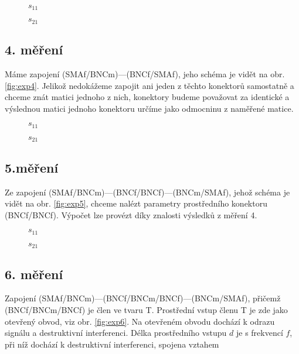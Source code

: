 \documentclass{protokol}
\begin{document}
\begin{figure}[htp]
	\centering
	
	\caption{$s_{11}$}
	\label{fig:03-s11}
\end{figure}

\begin{figure}[htp]
	\centering
	
	\caption{$s_{21}$}
	\label{fig:03-s21}
\end{figure}

\subsection{4. měření}
Máme zapojení (SMAf/BNCm)---(BNCf/SMAf), jeho schéma je vidět na obr. \ref{fig:exp4}. Jelikož nedokážeme zapojit ani jeden z těchto konektorů samostatně a chceme znát matici jednoho z nich, konektory budeme  považovat za identické a výslednou matici jednoho konektoru určíme jako odmocninu z naměřené matice.

\begin{figure}[htp]
	\centering
	
	\caption{$s_{11}$}
	\label{fig:04-s11}
\end{figure}

\begin{figure}[htp]
	\centering
	
	\caption{$s_{21}$}
	\label{fig:04-s21}
\end{figure}


\subsection{5.měření}
Ze zapojení (SMAf/BNCm)---(BNCf/BNCf)---(BNCm/SMAf), jehož schéma je vidět na obr. \ref{fig:exp5}, chceme nalézt parametry prostředního konektoru (BNCf/BNCf). Výpočet lze provézt díky znalosti výsledků z měření 4.

\begin{figure}[htp]
	\centering
	
	\caption{$s_{11}$}
	\label{fig:05-s11}
\end{figure}

\begin{figure}[htp]
	\centering
	
	\caption{$s_{21}$}
	\label{fig:05-s21}
\end{figure}

\subsection{6. měření}
Zapojení (SMAf/BNCm)---(BNCf/BNCm/BNCf)---(BNCm/SMAf), přičemž (BNCf/BNCm/BNCf) je člen ve tvaru T. Prostřední vstup členu T je zde jako otevřený obvod, viz obr. \ref{fig:exp6}. Na otevřeném obvodu dochází k odrazu signálu a destruktivní interferenci. Délka prostředního vstupu $d$ je s frekvencí $f$, při níž dochází k destruktivní interferenci, spojena vztahem
\end{document}
